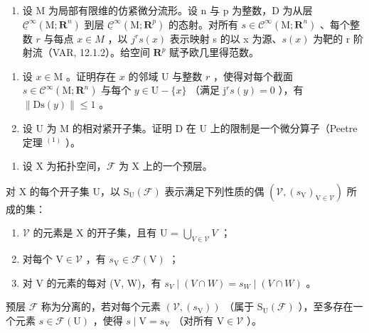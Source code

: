 \begin{enumerate}
\def\labelenumi{\arabic{enumi})}
\setcounter{enumi}{2}
\tightlist
\item
  设 M 为局部有限维的仿紧微分流形。设 n 与 p 为整数，D 为从层 \(\underline{\mathcal{C}}^{\infty}(\mathrm{M};\mathbf{R}^{n})\) 到层 \(\underline{\mathcal{C}}^{\infty}(\mathrm{M};\mathbf{R}^{p})\) 的态射。对所有 \(s \in \mathcal{C}^{\infty}(\mathrm{M};\mathbf{R}^{n})\) 、每个整数 \(r\) 与每点 \(x \in M\) ，以 \(j^{r}s(x)\) 表示映射 s 的以 x 为源、\(s(x)\) 为靶的 r 阶射流（VAR, 12.1.2）。给空间 \(\mathbf{R}^{p}\) 赋予欧几里得范数。
\end{enumerate}

\begin{enumerate}
\def\labelenumi{\alph{enumi})}
\item
  设 \(x \in \mathrm{M}\) 。证明存在 \(x\) 的邻域 U 与整数 \(r\) ，使得对每个截面 \(s \in \mathcal{C}^{\infty}(\mathrm{M}; \mathbf{R}^{n})\) 与每个 \(y \in \mathrm{U} - \{x\}\) （满足 \(\mathrm{j}^{r}s(y) = 0\) ），有 \(\| \mathrm{Ds}(y) \| \leqslant 1\) 。
\item
  设 U 为 M 的相对紧开子集。证明 D 在 U 上的限制是一个微分算子（Peetre 定理 \(^{(1)}\) ）。
\end{enumerate}

\begin{enumerate}
\def\labelenumi{\arabic{enumi})}
\setcounter{enumi}{3}
\tightlist
\item
  设 X 为拓扑空间，\(\mathcal{F}\) 为 X 上的一个预层。
\end{enumerate}

对 X 的每个开子集 U，以 \(\mathrm{S}_{\mathrm{U}}(\mathcal{F})\) 表示满足下列性质的偶 \((\mathcal{V}, (s_{\mathrm{V}})_{\mathrm{V} \in \mathcal{V}})\) 所成的集：

\begin{enumerate}
\def\labelenumi{(\roman{enumi})}
\item
  \(\mathcal{V}\) 的元素是 X 的开子集，且有 U = \(\bigcup_{V\in\mathcal{V}}V\) ；
\item
  对每个 \(\mathrm{V} \in \mathcal{V}\) ，有 \(s_{\mathrm{V}} \in \mathcal{F}(\mathrm{V})\) ；
\item
  对 V 的元素的每对 (V, W)，有 \(s_{V} \mid (V \cap W) = s_{W} \mid (V \cap W)\) 。
\end{enumerate}

预层 \(\mathcal{F}\) 称为分离的，若对每个元素 \((\mathcal{V},(s_{\mathrm{V}}))\) （属于 \(\mathrm{S_U}(\mathcal{F})\) ），至多存在一个元素 \(s\in \mathcal{F}(\mathrm{U})\) ，使得 \(s\mid \mathrm{V} = s_{\mathrm{V}}\) （对所有 \(\mathrm{V}\in \mathcal{V}\) ）。

